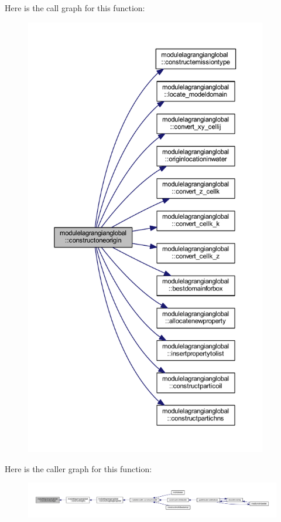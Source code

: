 Here is the call graph for this function\+:\nopagebreak
\begin{figure}[H]
\begin{center}
\leavevmode
\includegraphics[height=550pt]{namespacemodulelagrangianglobal_a13e19af68aa547fbcd1d97158976b7ef_cgraph}
\end{center}
\end{figure}
Here is the caller graph for this function\+:\nopagebreak
\begin{figure}[H]
\begin{center}
\leavevmode
\includegraphics[width=350pt]{namespacemodulelagrangianglobal_a13e19af68aa547fbcd1d97158976b7ef_icgraph}
\end{center}
\end{figure}
\mbox{\label{namespacemodulelagrangianglobal_a18659553d3e4f0917dd7bc0bcdb6d109}} 
